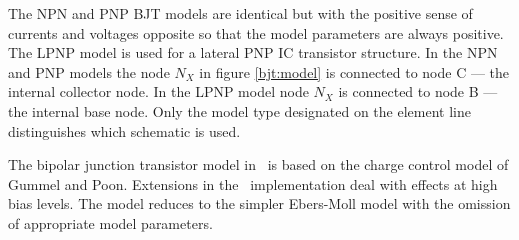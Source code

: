 The NPN and PNP BJT models are identical but with the positive
sense of currents and voltages opposite so that the model
parameters are always positive. The LPNP model is used for a
lateral PNP IC transistor structure. In the NPN and PNP models the
node $N_X$ in figure \ref{bjt:model} is connected to node C ---
the internal collector node. In the LPNP model node $N_X$ is
connected to node B --- the internal base node. Only the model
type designated on the element line distinguishes which schematic
is used.

The bipolar junction transistor model in \spice\  is based on the
charge control model of Gummel and Poon. Extensions in the \spice\
implementation deal with effects at high bias levels.  The model
reduces to the simpler Ebers-Moll model with the omission of
appropriate model parameters.

